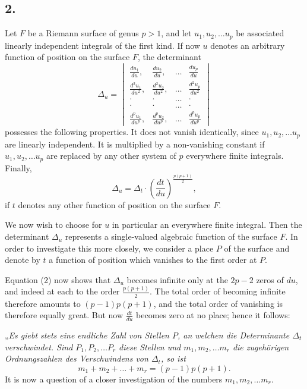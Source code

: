 \documentclass{article}
\begin{document}
\subsection*{2.}

Let $F$ be a Riemann surface of genus $p > 1$, and let $u_1, u_2, \dots u_p$ be associated linearly independent integrals of the first kind. If now $u$ denotes an arbitrary function of position on the surface $F$, the determinant
\[
\Delta_u =
\begin{vmatrix}
\frac{du_1}{du}, & \frac{du_2}{du}, & \dots & \frac{du_p}{du} \\
\frac{d^2u_1}{du^2}, & \frac{d^2u_2}{du^2}, & \dots & \frac{d^2u_p}{du^2} \\
\cdot & \cdot & \dots & \cdot \\
\cdot & \cdot & \dots & \cdot \\
\frac{d^p u_1}{du^p}, & \frac{d^p u_2}{du^p}, & \dots & \frac{d^p u_p}{du^p}
\end{vmatrix}
\tag{1}
\]
possesses the following properties. It does not vanish identically, since $u_1, u_2, \dots u_p$ are linearly independent. It is multiplied by a non-vanishing constant if $u_1, u_2, \dots u_p$ are replaced by any other system of $p$ everywhere finite integrals. Finally,
\[
\Delta_u = \Delta_t \cdot \left(\frac{dt}{du}\right)^{\frac{p(p+1)}{2}},
\tag{2}
\]
if $t$ denotes any other function of position on the surface $F$.

We now wish to choose for $u$ in particular an everywhere finite integral. Then the determinant $\Delta_u$ represents a single-valued algebraic function of the surface $F$. In order to investigate this more closely, we consider a place $P$ of the surface and denote by $t$ a function of position which vanishes to the first order at $P$.

Equation (2) now shows that $\Delta_u$ becomes infinite only at the $2p - 2$ zeros of $du$, and indeed at each to the order $\frac{p(p+1)}{2}$. The total order of becoming infinite therefore amounts to $(p-1)p(p+1)$, and the total order of vanishing is therefore equally great. But now $\frac{dt}{du}$ becomes zero at no place; hence it follows:

„\emph{Es giebt stets eine endliche Zahl von Stellen $P$, an welchen die Determinante $\Delta_t$ verschwindet. Sind $P_1, P_2, \dots P_r$ diese Stellen und $m_1, m_2, \dots m_r$ die zugehörigen Ordnungszahlen des Verschwindens von $\Delta_t$, so ist}
\[
m_1 + m_2 + \dots + m_r = (p-1)p(p+1).
\tag{3}
\]
It is now a question of a closer investigation of the numbers $m_1, m_2, \dots m_r$.
\end{document}

